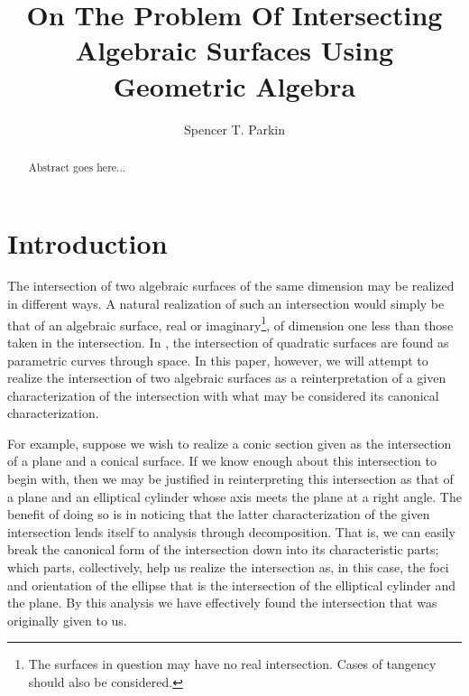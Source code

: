 \documentclass{birkjour}
\theoremstyle{definition}
\theoremstyle{remark}
\numberwithin{equation}{section}
\begin{document}
\title{On The Problem Of Intersecting\\Algebraic Surfaces Using\\Geometric Algebra}

\author{Spencer T. Parkin}
\address{102 W. 500 S., \\
Salt Lake City, UT  84101} 



\begin{abstract}
Abstract goes here...
\end{abstract}


\maketitle

\section{Introduction}

The intersection of two algebraic surfaces of the same dimension may be
realized in different ways.  A natural realization of such an intersection would
simply be that of an algebraic surface, real or imaginary\footnote{The surfaces
in question may have no real intersection.  Cases of tangency should also be considered.},
of dimension one
less than those taken in the intersection.  In \cite{}, the intersection of quadratic surfaces
are found as parametric curves through space.
In this paper, however, we will attempt to realize the intersection of two algebraic surfaces as a
reinterpretation of a given characterization of the intersection with what may be considered
its canonical characterization.

For example, suppose we wish to realize a conic section given as the intersection of a plane
and a conical surface.  If we know enough about this intersection to begin with, then we may
be justified in reinterpreting this intersection as that of a plane and an elliptical cylinder whose
axis meets the plane at a right angle.  The benefit of doing so is in noticing that the latter
characterization of the given intersection lends itself to analysis through decomposition.
That is, we can easily break the canonical form of the intersection down into its characteristic
parts; which parts, collectively, help us realize the intersection as, in this case, the foci and orientation of
the ellipse that is the intersection of the elliptical cylinder and the plane.  By this analysis
we have effectively found the intersection that was originally given to us.
\end{document}

